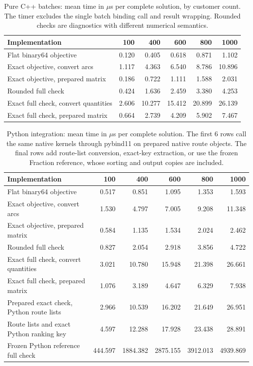 \begin{table}[htbp]
\centering\small
\begin{tabularx}{\linewidth}{@{}Xrrrrr@{}}
\toprule
Implementation & 100 & 400 & 600 & 800 & 1000\\
\midrule
Flat binary64 objective & 0.120 & 0.405 & 0.618 & 0.871 & 1.102\\
Exact objective, convert arcs & 1.117 & 4.363 & 6.540 & 8.786 & 10.896\\
Exact objective, prepared matrix & 0.186 & 0.722 & 1.111 & 1.588 & 2.031\\
Rounded full check & 0.424 & 1.636 & 2.459 & 3.380 & 4.253\\
Exact full check, convert quantities & 2.606 & 10.277 & 15.412 & 20.899 & 26.139\\
Exact full check, prepared matrix & 0.664 & 2.739 & 4.209 & 5.902 & 7.467\\
\bottomrule
\end{tabularx}
\caption{Pure C++ batches: mean time in $\mu$s per complete solution, by customer count. The timer excludes the single batch binding call and result wrapping. Rounded checks are diagnostics with different numerical semantics.}\label{tab:native-kernels}
\end{table}

\begin{table}[htbp]
\centering\small
\begin{tabularx}{\linewidth}{@{}Xrrrrr@{}}
\toprule
Implementation & 100 & 400 & 600 & 800 & 1000\\
\midrule
Flat binary64 objective & 0.517 & 0.851 & 1.095 & 1.353 & 1.593\\
Exact objective, convert arcs & 1.530 & 4.797 & 7.005 & 9.208 & 11.348\\
Exact objective, prepared matrix & 0.584 & 1.135 & 1.534 & 2.024 & 2.462\\
Rounded full check & 0.827 & 2.054 & 2.918 & 3.856 & 4.722\\
Exact full check, convert quantities & 3.021 & 10.780 & 15.948 & 21.398 & 26.661\\
Exact full check, prepared matrix & 1.076 & 3.189 & 4.647 & 6.329 & 7.938\\
Prepared exact check, Python route lists & 2.966 & 10.539 & 16.202 & 21.649 & 26.951\\
Route lists and exact Python ranking key & 4.597 & 12.288 & 17.928 & 23.438 & 28.891\\
Frozen Python reference full check & 444.597 & 1884.382 & 2875.155 & 3912.013 & 4939.869\\
\bottomrule
\end{tabularx}
\caption{Python integration: mean time in $\mu$s per complete solution. The first 6 rows call the same native kernels through pybind11 on prepared native route objects. The final rows add route-list conversion, exact-key extraction, or use the frozen Fraction reference, whose sorting and output copies are included.}\label{tab:native-integration}
\end{table}

